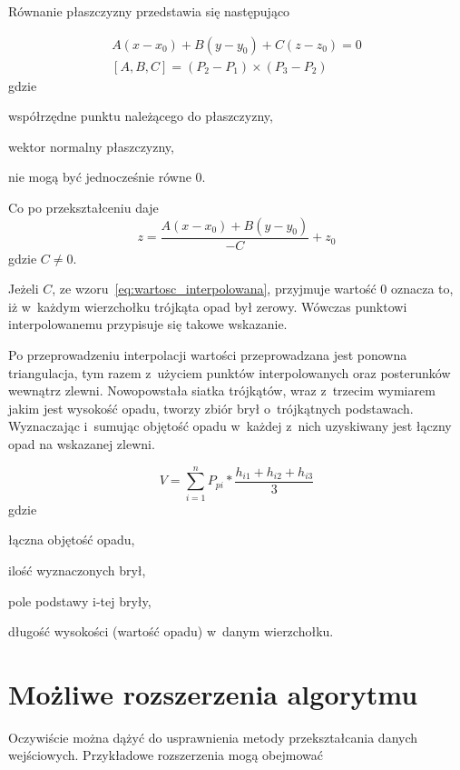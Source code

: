 Równanie płaszczyzny przedstawia się następująco

\begin{equation}
\begin{gathered}
A(x - x_0) + B(y - y_0) + C(z - z_0) = 0 \\
[A, B, C] = (P_2 - P_1) \times (P_3 - P_2)
\label{eq:rownanie_plaszczyzny}
\end{gathered}
\end{equation}
gdzie
\begin{description}[leftmargin=3cm, itemsep=0cm, labelsep=0cm]
	\item[$x_0, y_0, z_0$] współrzędne punktu należącego do płaszczyzny,
	\item[$A, B, C$] wektor normalny płaszczyzny, %
	\item[$A, B, C$] nie mogą być jednocześnie równe 0.
\end{description}
%
Co po przekształceniu daje
\begin{equation}
\label{eq:wartosc_interpolowana}
	z = \frac{A(x - x_0) + B(y - y_0)}{-C} + z_0
\end{equation}
gdzie $C \neq 0$.


Jeżeli $C$, ze wzoru~\ref{eq:wartosc_interpolowana}, przyjmuje wartość 0 oznacza to, iż w~każdym wierzchołku trójkąta opad był zerowy. Wówczas punktowi interpolowanemu przypisuje się takowe wskazanie.

Po przeprowadzeniu interpolacji wartości przeprowadzana jest ponowna triangulacja, tym razem z~użyciem punktów interpolowanych oraz posterunków wewnątrz zlewni. Nowopowstała siatka trójkątów, wraz z~trzecim wymiarem jakim jest wysokość opadu, tworzy zbiór brył o~trójkątnych podstawach. Wyznaczając i~sumując objętość opadu w~każdej z~nich uzyskiwany jest łączny opad na wskazanej zlewni.

\begin{equation}
\label{eq:opad_powierzchniowy}
	V = \sum_{i=1}^{n}P_{pi}*\frac{h_{i1}+h_{i2}+h_{i3}}{3}
\end{equation}
gdzie
\begin{description}[leftmargin=3cm, itemsep=0cm, labelsep=0cm]
	\item[$V$] łączna objętość opadu,
	\item[$n$] ilość wyznaczonych brył,
	\item[$P_{pi}$] pole podstawy i-tej bryły,
	\item[$h_{i1}, h_{i2}, h_{i3}$] długość wysokości (wartość opadu) w~danym wierzchołku.
\end{description}




\section{Możliwe rozszerzenia algorytmu}
Oczywiście można dążyć do usprawnienia metody przekształcania danych wejściowych.
Przykładowe rozszerzenia mogą obejmować
